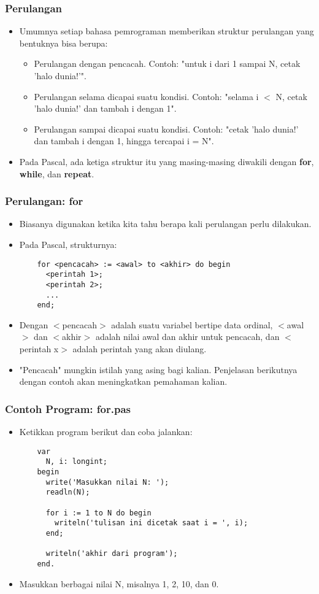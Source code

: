 \begin{frame}
\frametitle{Perulangan}
\begin{itemize}
  \item Umumnya setiap bahasa pemrograman memberikan struktur perulangan yang bentuknya bisa berupa:
  \begin{itemize}
    \item Perulangan dengan pencacah. Contoh: "untuk i dari 1 sampai N, cetak 'halo dunia!'".
    \item Perulangan selama dicapai suatu kondisi. Contoh: "selama i $<$ N, cetak 'halo dunia!' dan tambah i dengan 1".
    \item Perulangan sampai dicapai suatu kondisi. Contoh: "cetak 'halo dunia!' dan tambah i dengan 1, hingga tercapai i = N".
  \end{itemize}
  \item Pada Pascal, ada ketiga struktur itu yang masing-masing diwakili dengan \alert{\textbf{for}}, \alert{\textbf{while}}, dan \alert{\textbf{repeat}}.
\end{itemize}
\end{frame}

\begin{frame}[fragile]
\frametitle{Perulangan: for}
\begin{itemize}
  \item Biasanya digunakan ketika kita tahu berapa kali perulangan perlu dilakukan.
  \item Pada Pascal, strukturnya:
  \begin{lstlisting}
    for <pencacah> := <awal> to <akhir> do begin
      <perintah 1>;
      <perintah 2>;
      ...
    end;
  \end{lstlisting}
  \item Dengan $<$pencacah$>$ adalah suatu variabel bertipe data \alert{ordinal}, $<$awal$>$ dan $<$akhir$>$ adalah nilai awal dan akhir untuk pencacah, dan $<$perintah x$>$ adalah perintah yang akan diulang.
  \item "Pencacah" mungkin istilah yang asing bagi kalian. Penjelasan berikutnya dengan contoh akan meningkatkan pemahaman kalian.
\end{itemize}
\end{frame}

\begin{frame}[fragile]
\frametitle{Contoh Program: for.pas}
\begin{itemize}
  \item Ketikkan program berikut dan coba jalankan:
  \begin{lstlisting}
    var
      N, i: longint;
    begin
      write('Masukkan nilai N: ');
      readln(N);

      for i := 1 to N do begin
        writeln('tulisan ini dicetak saat i = ', i);
      end;

      writeln('akhir dari program');
    end.
  \end{lstlisting}
  \item Masukkan berbagai nilai N, misalnya 1, 2, 10, dan 0.
\end{itemize}
\end{frame}

